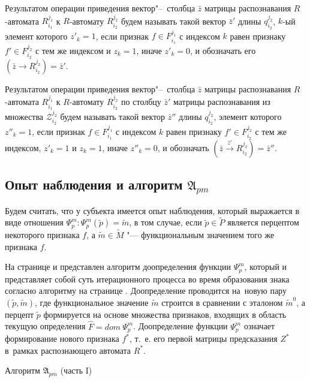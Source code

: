 \begin{Def}
	Результатом операции приведения вектор"--~столбца $\bar z$ матрицы распознавания $R$-автомата $R_{i_1}^{j_1}$ к $R$-автомату $R_{i_2}^{j_2}$ будем называть такой вектор $\bar z'$ длины $q_{i_2}^{j_2}$, $k$-ый элемент которого $z'_k=1$, если признак $f\in F_{i_1}^{j_1}$ с индексом $k$ равен признаку $f'\in F_{i_2}^{j_2}$ с тем же индексом и $z_k=1$, иначе $z'_k=0$, и обозначать его $(\bar z\rightarrow R_{i_2}^{j_2})=\bar z'$.
\end{Def}

\begin{Def}
	Результатом операции приведения вектор"--~столбца $\bar z$ матрицы распознавания $R$-автомата $R_{i_1}^{j_1}$ к $R$-автомату $R_{i_2}^{j_2}$ по столбцу $\bar z'$ матрицы распознавания из множества  $\mathcal Z_{i_2}^{j_2}$ будем называть такой вектор $\bar z''$ длины $q_{i_2}^{j_2}$, элемент которого $z''_k=1$, если признак $f\in F_{i_1}^{j_1}$ с индексом $k$ равен признаку $f'\in F_{i_2}^{j_2}$ с тем же индексом, $z'_k=1$ и $z_k=1$, иначе $z''_k=0$, и обозначать $(\bar z\xrightarrow{\bar z'} R_{i_2}^{j_2})=\bar z''$.
\end{Def}

\subsection{Опыт наблюдения и алгоритм $\mathfrak A_{pm}$}

Будем считать, что у субъекта имеется опыт наблюдения, который выражается в виде отношения $\Psi_p^m: \Psi_p^m(\tilde p)=\tilde m$, в том случае, если $\tilde p\in\tilde P$ является перцептом некоторого признака $f$, а $\tilde m\in\tilde M$ "--- функциональным значением того же признака $f$.

На странице \pageref{alg:cycle_pm_start} и \pageref{alg:cycle_pm_end} представлен алгоритм доопределения функции $\Psi_p^m$, который и представляет собой суть итерационного процесса во время образования знака согласно алгоритму на странице \pageref{new_sign_alg}. Доопределение проводится на~новую пару $(\tilde p,\tilde m)$, где функциональное значение $\tilde m$ строится в сравнении с эталоном $\tilde m^0$, а перцепт $\tilde p$ формируется на основе множества признаков, входящих в область текущую определения $\hat F=dom\ \Psi_p^m$. Доопределение функции $\Psi_p^m$ означает формирование нового признака $f^*$, т.~е. его первой матрицы предсказания $Z^*$ в~рамках распознающего автомата $R^*$.

\begin{algorithm}[h]
	\caption{Алгоритм $\mathfrak{A}_{pm}$ (часть I)}
	\label{alg:cycle_pm_start}
	\begin{algorithmic}[1]
		
	\end{algorithmic}
\end{algorithm}

